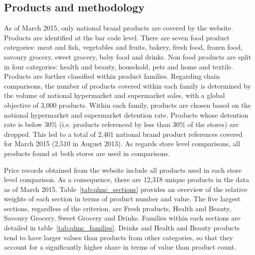 \documentclass[english]{article}
\begin{document}
\subsection{Products and methodology}

As of March 2015, only national brand products are covered by the website. Products are identified at the bar code level. There are seven food product categories: meat and fish, vegetables and fruits, bakery, fresh food, frozen food, savoury grocery, sweet grocery, baby food and drinks. Non food products are split in four categories: health and beauty, household, pets and home and textile. Products are further classified within product families. Regarding chain comparisons, the number of products covered within each family is determined by the volume of national hypermarket and supermarket sales, with a global objective of 3,000 products. Within each family, products are chosen based on the national hypermarket and supermarket detention rate. Products whose detention rate is below 30\% (i.e. products referenced by less than 30\% of the stores) are dropped. This led to a total of 2,461 national brand product references covered for March 2015 (2,510 in August 2013). As regards store level comparisons, all products found at both stores are used in comparisons.

Price records obtained from the website include all products used in each store level comparison. As a consequence, there are 12,318 unique products in the data as of March 2015. Table~\ref{tab:qlmc_sections} provides an overview of the relative weights of each section in terms of product number and value. The five largest sections, regardless of the criterion, are Fresh products, Health and Beauty, Savoury Grocery, Sweet Grocery and Drinks. Families within each sections are detailed in table~\ref{tab:qlmc_families}. Drinks and Health and Beauty products tend to have larger values than products from other categories, so that they account for a significantly higher share in terms of value than product count.
\end{document}
